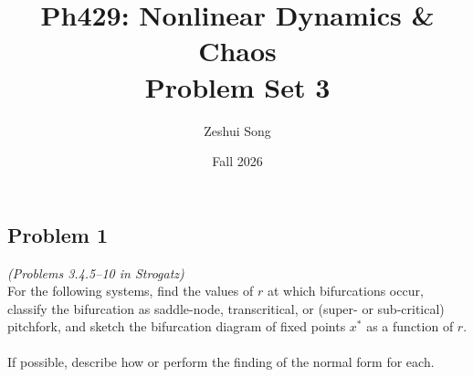 \documentclass[11pt]{article}
\title{\textbf{Ph429: Nonlinear Dynamics \& Chaos}\\[0.5ex]\Large Problem Set 3}
\author{Zeshui Song}
\date{Fall 2026}
\begin{document}
\maketitle

\vspace{-1em}
\subsection*{Problem 1}
\textit{(Problems 3.4.5--10 in Strogatz)}\\
For the following systems, find the values of $r$ at which bifurcations occur, classify the bifurcation as saddle-node, transcritical, or (super- or sub-critical) pitchfork, and sketch the bifurcation diagram of fixed points $x^*$ as a function of $r$.\\\\
If possible, describe how or perform the finding of the normal form for each.
\end{document}
